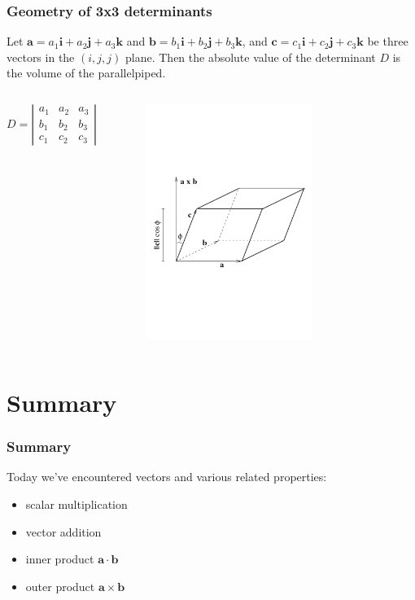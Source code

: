 \documentclass{beamer}
\begin{document}
\begin{frame}
\frametitle{Geometry of 3x3 determinants}
Let $\mathbf{a} = a_1 \mathbf{i} + a_2 \mathbf{j} + a_3 \mathbf{k}$  and $\mathbf{b} = b_1 \mathbf{i} + b_2 \mathbf{j} + b_3 \mathbf{k}$, and   $\mathbf{c} = c_1 \mathbf{i} + c_2 \mathbf{j} + c_3 \mathbf{k}$ be three vectors in the 
$(i,j,j)$ plane. Then the absolute value of the determinant $D$ is the volume of the parallelpiped.
\begin{columns}[c]

$$D =  
\left| \begin{array}{ccc}
a_1 & a_2 & a_3\\
b_1 & b_2 & b_3\\
c_1 & c_2 & c_3
\end{array}
\right|$$
\begin{figure}[htbp]
\begin{center}
 \includegraphics[width=0.7\textwidth]{volume_parallelepiped.pdf}
\caption{}
\end{center}
\end{figure}
\end{columns}
\end{frame}

\section{Summary}
\begin{frame}
\frametitle{Summary}
Today we've encountered vectors and various related properties:
\begin{itemize}
\item scalar multiplication
\item vector addition
\item inner product  $\mathbf{a} \cdot  \mathbf{b}$
\item outer product $\mathbf{a} \times \mathbf{b}$
\end{itemize}
\end{frame}
\end{document}

